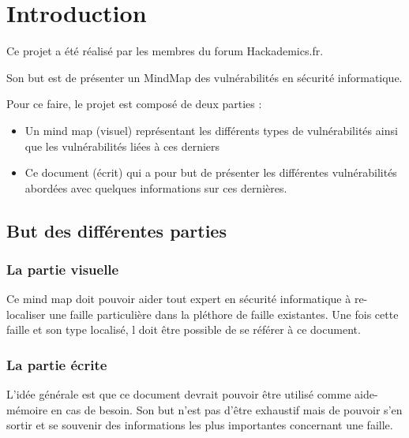 

\chapter*{Introduction}\label{introduction}


Ce projet a été réalisé par les membres du forum Hackademics.fr.

Son but est de présenter un MindMap des vulnérabilités en sécurité informatique.

Pour ce faire, le projet est composé de deux parties : 
\begin{itemize}
\item Un mind map (visuel) représentant les différents types de vulnérabilités ainsi que les vulnérabilités liées à ces derniers
\item Ce document (écrit) qui a pour but de présenter les différentes vulnérabilités abordées avec quelques informations sur ces dernières.
\end{itemize}


\section{But des différentes parties}

\subsection{La partie visuelle}
Ce mind map doit pouvoir aider tout expert en sécurité informatique à re-localiser une faille particulière dans la pléthore de faille existantes. 
Une fois cette faille et son type localisé, l doit être possible de se référer à ce document.

 \subsection{La partie écrite}
 L'idée générale est que ce document devrait pouvoir être utilisé comme aide-mémoire en cas de besoin.  Son but n'est pas d'être exhaustif mais de pouvoir s'en sortir et se souvenir des informations les plus importantes concernant une faille.

\endinput
